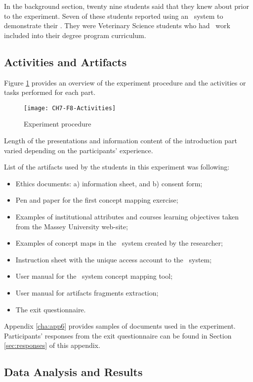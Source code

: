 In the background section, twenty nine students said that they knew about
\textit{\ep} prior to the experiment. Seven of these students reported using an
\ep~system to demonstrate their \LLLsn. They were Veterinary Science students
who had \ep~work included into their degree program curriculum.

\subsection{Activities and Artifacts}

Figure \ref{fig:procedure} provides an overview of the experiment procedure and
the activities or tasks performed for each part.

\begin{figure}[htb]
\centering
\texttt{[image: CH7-F8-Activities]}
\caption{Experiment procedure}
\label{fig:procedure}
\end{figure}

Length of the presentations and information content of the introduction part
varied depending on the participants' experience.

List of the artifacts used by the students in this experiment was following:

\begin{itemize}
  \item Ethics documents: a) information sheet, and b) consent form;
  \item Pen and paper for the first concept mapping exercise;
  \item Examples of institutional attributes and courses learning objectives
  taken from the Massey University web-site;
  \item Examples of concept maps in the \ep~system created by the researcher;
  \item Instruction sheet with the unique access account to the \ep~system;
  \item User manual for the \ep~system concept mapping tool;
  \item User manual for artifacts fragments extraction;
  \item The exit questionnaire.
\end{itemize} 

Appendix \ref{cha:app6} provides samples of documents used in the experiment.
Participants' responses from the exit questionnaire can be found in Section
\ref{sec:responses} of this appendix.

\subsection{Data Analysis and Results}

